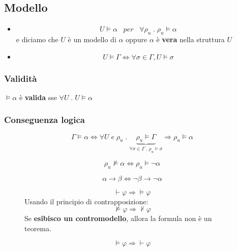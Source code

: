 \documentclass{article}
\theoremstyle{break}
\theoremstyle{break}
\theoremstyle{break}
\theoremstyle{break}
\begin{document}
  \subsection{Modello}
  \begin{itemize}
    \item 
      \[
        U \models \alpha \;\;\; per \;\;\; \forall \rho_u \;.\; \rho_u \models \alpha
      \] 
      e diciamo che \( U \) è un modello di \( \alpha \) oppure \( \alpha \) è \textbf{vera} nella struttura \( U \) 
    \item \[
        U \models \Gamma \Leftrightarrow \forall \sigma \in \Gamma, U \models \sigma
      \] 
  \end{itemize}
  \subsubsection{Validità}
  \( \models \alpha \) è \textbf{valida} sse \( \forall U \; . \; U \models \alpha \) 

  \subsubsection{Conseguenza logica}
  \[
    \Gamma \models \alpha \Leftrightarrow \forall U \; e \; \rho_u \; . \; \underbrace{\rho_u \models \Gamma}_{\forall \sigma \in \Gamma \; . \; \rho_u \models \sigma} \Rightarrow \rho_u \models \alpha
  \] 
  \begin{figure}[H]
    \begin{definition}
      \[
        \rho_u \not\models \alpha \Leftrightarrow \rho_u \models \neg \alpha
      \] 
    \end{definition}
  \end{figure}
  \begin{figure}[H]
    \begin{figure}[H]
      \begin{definition}
        \[
          \alpha \to \beta \Leftrightarrow \neg \beta \to \neg \alpha
        \] 
      \end{definition}
    \end{figure}
    \begin{definition}[Soundness]
      \[
        \vdash \varphi  \Rightarrow \models \varphi 
      \] 
      Usando il principio di contrapposizione:
      \[
        \not\models \varphi  \Rightarrow \not\vdash \varphi 
      \] 
      Se \textbf{esibisco un contromodello}, allora la formula non è un teorema.
    \end{definition}
  \end{figure}
  \begin{figure}[H]
    \begin{definition}[Completeness]
      \[
        \models \varphi  \Rightarrow \vdash \varphi 
      \] 
    \end{definition}
  \end{figure}
\end{document}

